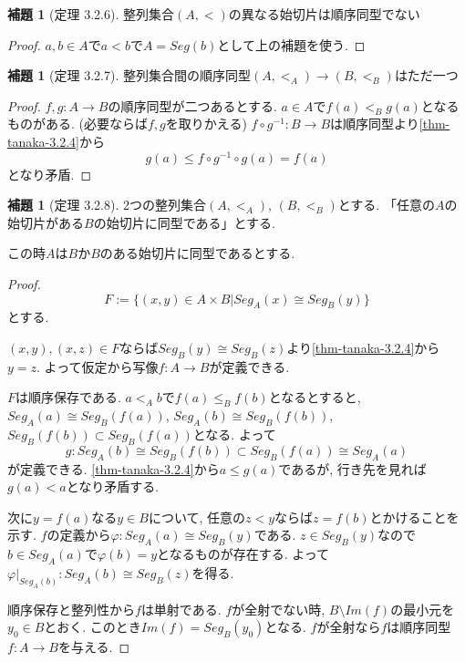 \documentclass[dvipdfmx,a4paper,11pt]{report}
\theoremstyle{definition}
\newtheorem{lem}[thm]{補題}
\begin{document}
 \begin{tcolorbox}
 [colback = white, colframe = green!35!black, fonttitle = \bfseries,breakable = true]
\begin{lem}[定理 3.2.6]
\label{thm-tanaka-3.2.6}
整列集合$(A,<)$の異なる始切片は順序同型でない
\end{lem}
\end{tcolorbox}
\begin{proof}
$a , b \in A$で$a < b$で$A=Seg(b)$として上の補題を使う.
\end{proof}

 \begin{tcolorbox}
 [colback = white, colframe = green!35!black, fonttitle = \bfseries,breakable = true]
\begin{lem}[定理 3.2.7]
整列集合間の順序同型$(A,<_A) \to (B,<_B)$はただ一つ
\end{lem}
\end{tcolorbox}
\begin{proof}
$f,g :  A \to B$の順序同型が二つあるとする.
$a \in A$で$f(a) <_{B} g(a)$となるものがある. (必要ならば$f,g$を取りかえる)
$f \circ g^{-1} : B \to B $は順序同型より\ref{thm-tanaka-3.2.4}から
$$
g(a) \le f \circ g^{-1} \circ g(a) = f(a)
$$
となり矛盾.
\end{proof}

 \begin{tcolorbox}
 [colback = white, colframe = green!35!black, fonttitle = \bfseries,breakable = true]
\begin{lem}[定理 3.2.8]
\label{thm-tanaka-3.2.8}
2つの整列集合$(A,<_A)$, $(B,<_B)$とする.
「任意の$A$の始切片がある$B$の始切片に同型である」とする.

この時$A$は$B$か$B$のある始切片に同型であるとする.
\end{lem}
\end{tcolorbox}

\begin{proof}
$$
F := \{ (x,y) \in A \times B | Seg_A(x) \cong Seg_B (y)\}
$$
とする.

$(x,y), (x,z) \in F$ならば$Seg_B (y)\cong Seg_B (z)$より\ref{thm-tanaka-3.2.4}から$y=z$.
よって仮定から写像$f : A \to B$が定義できる.

$F$は順序保存である.
$a<_A b$で$f(a) \le_B f(b)$となるとすると,  
$Seg_A(a) \cong Seg_B (f(a))$, 
$Seg_A(b) \cong Seg_B (f(b))$, 
$Seg_B (f(b)) \subset Seg_B (f(a))$となる. 
よって
$$
g: Seg_{A}(b) \cong Seg_B (f(b)) \subset Seg_B (f(a)) \cong Seg_A(a)
$$
が定義できる. \ref{thm-tanaka-3.2.4}から$a \le g(a)$であるが, 行き先を見れば$g(a) < a$となり矛盾する.

次に$y = f(a)$なる$y \in B$について, 任意の$z < y$ならば$z = f(b)$とかけることを示す. 
$f$の定義から$\varphi : Seg_A(a) \cong Seg_B(y)$である. $z \in Seg_{B}(y)$なので$b \in Seg_A(a) $で$\varphi(b) =y$となるものが存在する. 
よって$\varphi|_{Seg_A(b)}: Seg_A(b) \cong Seg_B(z)$を得る. 

順序保存と整列性から$f$は単射である. 
$f$が全射でない時, $B \setminus Im(f)$の最小元を$y_0 \in B$とおく. 
このとき$Im(f) = Seg_{B}(y_0)$となる. 
$f$が全射なら$f$は順序同型$f : A \to B$を与える.

\end{proof}
\end{document}
